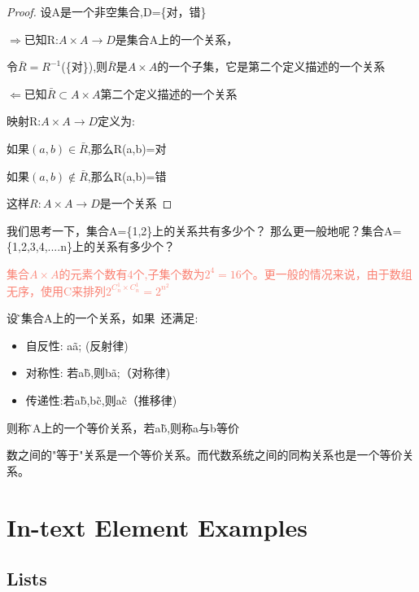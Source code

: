 \documentclass[
	11pt, %
	fleqn, %
	a4paper, %
]{LegrandOrangeBook}
\begin{document}
\begin{proof}
	设A是一个非空集合,D=\{对，错\}

	$\Rightarrow $已知R:$A\times A\rightarrow D$是集合A上的一个关系，

	令$\bar{R}=R^{-1}$(\{对\}),则$\bar{R}$是$A\times A$的一个子集，它是第二个定义描述的一个关系

	$\Leftarrow$已知$\bar{R}\subset A\times A$第二个定义描述的一个关系

	映射R:$A\times A\rightarrow D$定义为:

	如果$(a,b)\in\bar{R}$,那么R(a,b)=对

	如果$(a,b)\not\in\bar{R}$,那么R(a,b)=错

	这样$R:A\times A\rightarrow D$是一个关系

\end{proof}

\begin{remark}
	我们思考一下，集合A=\{1,2\}上的关系共有多少个？
	那么更一般地呢？集合A=\{1,2,3,4,....n\}上的关系有多少个？

	\textcolor{Salmon}{集合$A\times A$的元素个数有$4$个,子集个数为$2^4=16$个。更一般的情况来说，由于数组无序，使用C来排列$2^{C_{n}^1\times C_{n}^1}=2^{n^2}$}
\end{remark}

\begin{definition}
	设\~是集合A上的一个关系，如果~还满足:
	\begin{itemize}
		\item 自反性: a\~a; (反射律)
		\item 对称性: 若a\~b,则b\~a;（对称律)
		\item 传递性:若a\~b,b\~c,则a\~c（推移律)
	\end{itemize}
	则称\~为A上的一个等价关系，若a\~b,则称a与b等价
\end{definition}
\begin{remark}
	数之间的"等于"关系是一个等价关系。而代数系统之间的同构关系也是一个等价关系。
\end{remark}
\chapter{In-text Element Examples}




\section{Lists}
\end{document}
